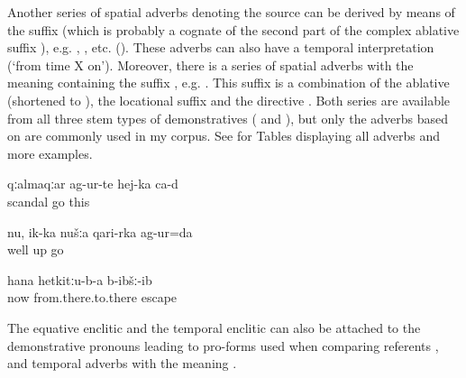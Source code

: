 Another series of spatial adverbs denoting the source can be derived by means of the suffix  (which is probably a cognate of the second part of the complex ablative suffix ), e.g.  ,  , etc. (). These adverbs can also have a temporal interpretation (`from time X on'). Moreover, there is a series of spatial adverbs with the meaning  containing the suffix , e.g.   . This suffix is a combination of the ablative  (shortened to ), the locational suffix  and the directive . Both series are available from all three stem types of demonstratives (  and ), but only the adverbs based on  are commonly used in my corpus. See  for Tables displaying all adverbs and more examples. 
%
\begin{exe}
	\ex	\label{ex:From here the scandal happened}
	\gll	qːalmaqːar	ag-ur-te	hej-ka	ca-d\\
		scandal	go 	this	\\
	\glt	{}

	\ex	\label{ex:Well we went from up there along the upper side}
	\gll	nu,	ik-ka	nušːa	qari-rka	ag-ur=da\\
		well			up	go\\
	\glt	{}

	\ex	\label{ex:(The dog) ran away to that side (from there to there)}
	\gll	hana	hetkitːu-b-a	b-ibšː-ib\\
		now	from.there.to.there	escape\\
	\glt	{}
\end{exe}
%
The equative enclitic   and the temporal enclitic   can also be attached to the demonstrative pronouns leading to pro-forms used when comparing referents ,  and temporal adverbs with the meaning  .


